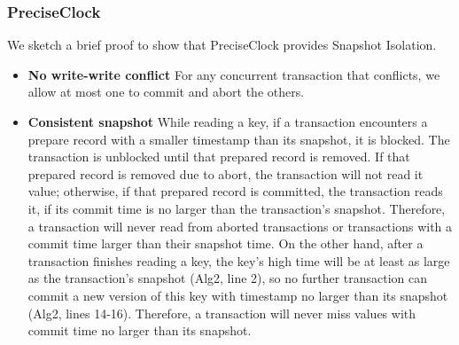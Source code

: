 \subsubsection{PreciseClock} 
We sketch a brief proof to show that PreciseClock provides Snapshot Isolation.
\begin{itemize}
\item \textbf{No write-write conflict} For any concurrent transaction that conflicts, we allow at most one to commit and abort the others.
\item \textbf{Consistent snapshot} While reading a key, if a transaction encounters a prepare record with a smaller timestamp than its snapshot, it is blocked. The transaction is unblocked until that prepared record is removed. If that prepared record is removed due to abort, the transaction will not read it value; otherwise, if that prepared record is committed, the transaction reads it, if its commit time is no larger than the transaction's snapshot. Therefore, a transaction will never read from aborted transactions or transactions with a commit time larger than their snapshot time. On the other hand, after a transaction finishes reading a key, the key's high time will be at least as large as the transaction's snapshot (Alg2, line 2), so no further transaction can commit a new version of this key with timestamp no larger than its snapshot (Alg2, lines 14-16). Therefore, a transaction will never miss values with commit time no larger than its snapshot.

\end{itemize}

